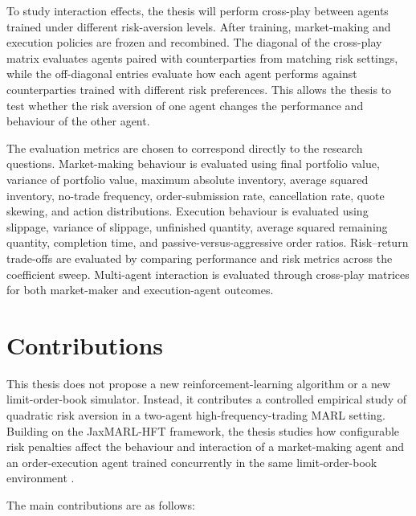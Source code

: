 \documentclass[oneside]{uva-inf-bachelor-thesis}
\begin{document}
To study interaction effects, the thesis will perform cross-play between agents trained under different risk-aversion levels. After training, market-making and execution policies are frozen and recombined. The diagonal of the cross-play matrix evaluates agents paired with counterparties from matching risk settings, while the off-diagonal entries evaluate how each agent performs against counterparties trained with different risk preferences. This allows the thesis to test whether the risk aversion of one agent changes the performance and behaviour of the other agent.

The evaluation metrics are chosen to correspond directly to the research questions. Market-making behaviour is evaluated using final portfolio value, variance of portfolio value, maximum absolute inventory, average squared inventory, no-trade frequency, order-submission rate, cancellation rate, quote skewing, and action distributions. Execution behaviour is evaluated using slippage, variance of slippage, unfinished quantity, average squared remaining quantity, completion time, and passive-versus-aggressive order ratios. Risk--return trade-offs are evaluated by comparing performance and risk metrics across the coefficient sweep. Multi-agent interaction is evaluated through cross-play matrices for both market-maker and execution-agent outcomes.


\section{Contributions}

This thesis does not propose a new reinforcement-learning algorithm or a new limit-order-book simulator. Instead, it contributes a controlled empirical study of quadratic risk aversion in a two-agent high-frequency-trading MARL setting. Building on the JaxMARL-HFT framework, the thesis studies how configurable risk penalties affect the behaviour and interaction of a market-making agent and an order-execution agent trained concurrently in the same limit-order-book environment \cite{mohl_jaxmarl-hft_2025}.

The main contributions are as follows:
\end{document}
